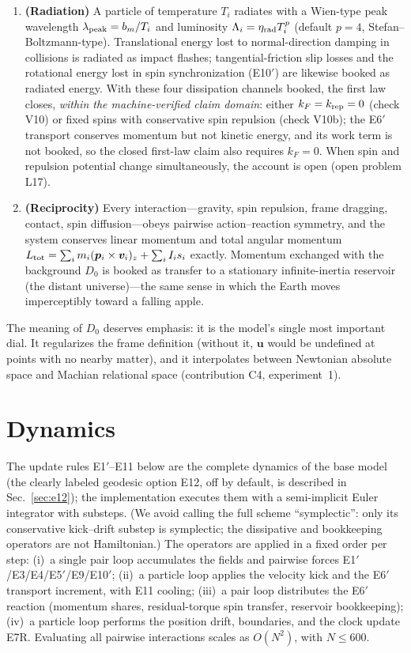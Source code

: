 \documentclass[aps,reprint,amsmath,amssymb,nofootinbib,superscriptaddress,floatfix]{revtex4-2}
\newcommand{\vect}[1]{\bm{#1}}
\newcommand{\Dz}{D_0}
\begin{document}
\begin{enumerate}
\item[A12$'$.]{\bf (Radiation)} A particle of temperature $T_i$
radiates with a Wien-type peak wavelength
$\lambda_{\rm peak} = b_m/T_i$ and luminosity
$\Lambda_i = \eta_{\rm rad}T_i^p$ (default $p = 4$,
Stefan--Boltzmann-type).
Translational energy lost to normal-direction damping in collisions is
radiated as impact flashes; tangential-friction slip losses and the
rotational energy lost in spin synchronization (E10$'$) are likewise
booked as radiated energy.
With these four dissipation channels booked, the first law closes,
\emph{within the machine-verified claim domain}: either
$k_F = k_{\rm rep} = 0$ (check V10) or fixed spins with conservative
spin repulsion (check V10b); the E6$'$ transport conserves momentum
but not kinetic energy, and its work term is not booked, so the closed
first-law claim also requires $k_F = 0$.
When spin and repulsion potential change
simultaneously, the account is open (open problem L17).

\item[A13.]{\bf (Reciprocity)} Every interaction---gravity, spin
repulsion, frame dragging, contact, spin diffusion---obeys pairwise
action--reaction symmetry, and the system conserves
linear momentum and total angular momentum
$L_{\rm tot} = \sum_i m_i(\vect{p}_i\times\vect{v}_i)_z
 + \sum_i I_i s_i$ exactly.
Momentum exchanged with the background $\Dz$ is booked as transfer to
a stationary infinite-inertia reservoir (the distant universe)---the
same sense in which the Earth moves imperceptibly toward a falling
apple.
\end{enumerate}

The meaning of $\Dz$ deserves emphasis: it is the model's single most
important dial.
It regularizes the frame definition (without it, $\vect{u}$ would be
undefined at points with no nearby matter), and it interpolates between
Newtonian absolute space and Machian relational space
(contribution C4, experiment~1).

\section{Dynamics}
\label{sec:dynamics}

The update rules E1$'$--E11 below are the complete dynamics of the
base model (the clearly labeled geodesic option E12, off by default,
is described in Sec.~\ref{sec:e12}); the implementation executes them
with a semi-implicit Euler integrator with substeps.
(We avoid calling the full scheme ``symplectic'': only its conservative
kick--drift substep is symplectic; the dissipative and bookkeeping
operators are not Hamiltonian.)
The operators are applied in a fixed order per step:
(i)~a single pair loop accumulates the fields and pairwise forces
E1$'$/E3/E4/E5$'$/E9/E10$'$;
(ii)~a particle loop applies the velocity kick and the E6$'$ transport
increment, with E11 cooling;
(iii)~a pair loop distributes the E6$'$ reaction (momentum shares,
residual-torque spin transfer, reservoir bookkeeping);
(iv)~a particle loop performs the position drift, boundaries, and the
clock update E7R.
Evaluating all pairwise interactions scales as $O(N^2)$, with
$N \le 600$.
\end{document}
